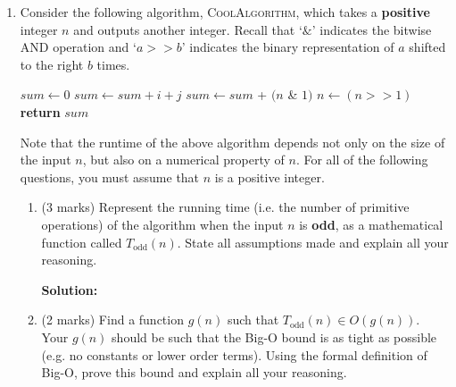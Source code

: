 \documentclass[a4,13pt]{extarticle}
\newenvironment{Solution}{\color{blue}\textbf{Solution:}}{}
\begin{document}
\begin{enumerate}
	\item   
	      Consider the following algorithm, \textsc{CoolAlgorithm}, which takes a \textbf{positive} integer $n$ and outputs another integer. 
	      Recall that `$\&$' indicates the bitwise AND operation and `$a >> b$' indicates the binary representation of $a$ shifted to the right $b$ times.
	      	      
	      \begin{algorithm}
	      	\begin{algorithmic}[1]
	      		\State $sum \gets 0$
	      		\State $sum \gets sum + i + j$ 
	      		\EndFor 
	      		\EndFor
	      		\Else
	      		\State $sum \gets sum$ + $(n$ \& $1)$
	      		\State $n \gets (n >> 1)$
	      		\EndWhile
	      		\EndIf
	      		\State \textbf{return} $sum$
	      		\EndProcedure
	      	\end{algorithmic}
	      \end{algorithm}
	      	          
	      Note that the runtime of the above algorithm depends not only on the size of the input $n$, but also on a numerical property of $n$. 
	      For all of the following questions, you must assume that $n$ is a positive integer.
	      	      
	      \begin{enumerate}
	      	\item (3 marks) Represent the running time (i.e. the number of primitive operations) of the algorithm 
	      	      when the input $n$ is \textbf{odd}, as a mathematical function called $T_{\text{odd}}(n)$. State all assumptions made and explain all your reasoning.
	      	      
	      	      \begin{Solution}
	      	      \end{Solution}
	      	      	      	                  
	      	\item (2 marks) Find a function $g(n)$ such that $T_{\text{odd}}(n)\in O(g(n))$. 
	      	      Your $g(n)$ should be such that the Big-O bound is as tight as possible (e.g. no constants or lower order terms). 
	      	      Using the formal definition of Big-O, prove this bound and explain all your reasoning. 
	      	      	      	                  

\end{enumerate}
\end{enumerate}
\end{document}

